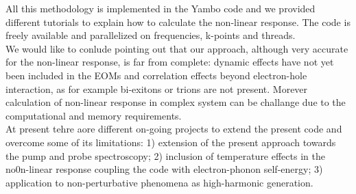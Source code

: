 All this methodology is implemented in the Yambo code\cite{yambo} and we provided different tutorials to explain how to calculate the non-linear response.\cite{yambo_wiki} The code is freely available and parallelized on frequencies, k-points and threads. \\
We would like to conlude pointing out that our approach, although very accurate for the non-linear response, is far from complete: dynamic effects have not yet been included in the EOMs and correlation effects beyond electron-hole interaction, as for example bi-exitons or trions are not present.\cite{schafer} Morever calculation of non-linear response in complex system can be challange due to the computational and memory requirements.\\
At present tehre aore different on-going projects to extend the present code and overcome some of its limitations: 1) extension of the present approach towards the pump and probe spectroscopy; 2) inclusion of temperature effects in the no0n-linear response coupling the code with electron-phonon self-energy; 3) application to non-perturbative phenomena as high-harmonic generation.




